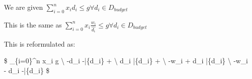 \documentclass[11pt]{article}
\begin{document}
We are given \(\sum_{i=0}^n x_id_i \le g \forall d_i \in D_{budget}\)

This is the same as
\(\sum_{i=0}^n x_i\frac{w_i}{\hat{d_i}} \le g \forall d_i \in D_{budget}\)

This is reformulated as:

\$ \sum\_\{i=0\}\^{}n x\_i \le g
\textbackslash{} -d\_i \le -\bar\{d\_i\} +  \textbackslash{}
d\_i \le \bar\{d\_i\} +  \textbackslash{} -w\_i + d\_i
\le \bar\{d\_i\} \textbackslash{} -w\_i - d\_i \le -\bar\{d\_i\} \$


    
    
    
    
\end{document}
